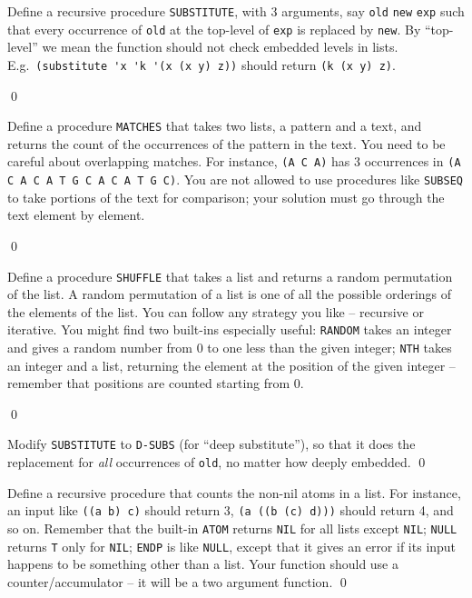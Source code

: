 \documentclass[a4paper,11pt]{article}
\begin{document}
\begin{uexercise}

Define a recursive  procedure \Verb+SUBSTITUTE+, with 3 arguments, say \Verb+old+ \Verb+new+ \Verb+exp+ such that every occurrence of \Verb+old+ at the top-level of \Verb+exp+ is replaced by \Verb+new+. By ``top-level'' we mean the function should not check embedded levels in lists. E.g.\ \Verb+(substitute 'x 'k '(x (x y) z))+ should return \Verb+(k (x y) z)+.

\qed
\end{uexercise}

\begin{uexercise}

Define a procedure \Verb+MATCHES+ that takes two lists, a pattern and a text, and returns the count of the occurrences of the pattern in the text. You need to be careful about overlapping matches. For instance, \Verb+(A C A)+ has 3 occurrences in \Verb+(A C A C A T G C A C A T G C)+. You are not allowed to use procedures like \Verb+SUBSEQ+ to take portions of the text for comparison; your solution must go through the text element by element.

\qed
\end{uexercise}

\begin{uexercise}
Define a procedure \Verb+SHUFFLE+ that takes a list and returns a random permutation of the list. A random permutation of a list is one of all the possible orderings of the elements of the list. You can follow any strategy you like -- recursive or iterative.
You might find two built-ins especially useful: \Verb+RANDOM+ takes an integer and gives a random number from 0 to one less than the given integer; \Verb+NTH+ takes an integer and a list, returning the element at the position of the given integer -- remember that positions are counted starting from 0.

\qed
\end{uexercise}

\begin{uexercise}

Modify \Verb+SUBSTITUTE+ to \Verb+D-SUBS+ (for ``deep substitute''), so that it does the replacement for \emph{all} occurrences of \Verb+old+, no matter how deeply embedded.
\qed
\end{uexercise}

\begin{uexercise}

Define a recursive procedure that counts the non-nil atoms  in a list. For instance, an input like \Verb+((a b) c)+ should return 3, \Verb+(a ((b (c) d)))+ should return 4, and so on. Remember that the  built-in \Verb+ATOM+ returns \Verb+NIL+ for all lists except \Verb+NIL+; \Verb+NULL+ returns \Verb+T+ only for \Verb+NIL+; \Verb+ENDP+ is like \Verb+NULL+, except that it gives an error if its input happens to be something other than a list. Your function should use a counter/accumulator -- it will be a two argument function.
\qed
\end{uexercise}
\end{document}

